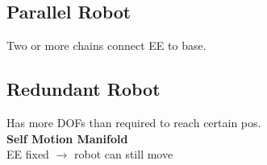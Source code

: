 \subsection{Parallel Robot}
    Two or more chains connect EE to base.
    \begin{minipage}{0.2\linewidth}
    \end{minipage}
\subsection{Redundant Robot}
    Has more DOFs than required to reach certain pos.\\
    \textbf{Self Motion Manifold}\\
    EE fixed $\to$ robot can still move